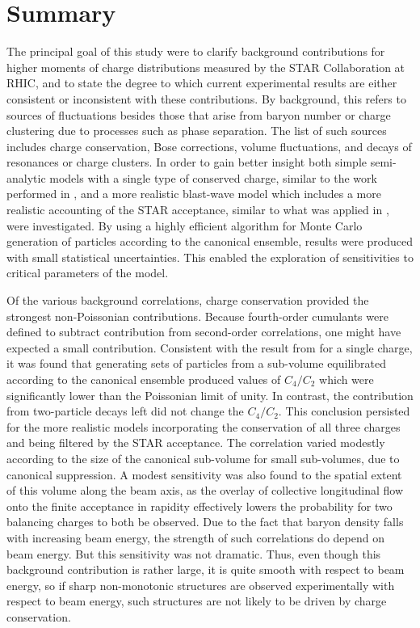 
\section{Summary}\label{sec:summary}
 
The principal goal of this study were to clarify background contributions for higher moments of charge distributions measured by the STAR Collaboration at RHIC, and to state the degree to which current experimental results are either consistent or inconsistent with these contributions. By background, this refers to sources of fluctuations besides those that arise from baryon number or charge clustering due to processes such as phase separation. The list of such sources includes charge conservation, Bose corrections, volume fluctuations, and decays of resonances or charge clusters. In order to gain better insight both simple semi-analytic models with a single type of conserved charge, similar to the work performed in \cite{Savchuk:2019xfg}, and a more realistic blast-wave model which includes a more realistic accounting of the STAR acceptance, similar to what was applied in \cite{Oliinychenko:2020cmr}, were investigated. By using a highly efficient algorithm for Monte Carlo generation of particles according to the canonical ensemble, results were produced with small statistical uncertainties. This enabled the exploration of sensitivities to critical parameters of the model.

Of the various background correlations, charge conservation provided the strongest non-Poissonian contributions. Because fourth-order cumulants were defined to subtract contribution from second-order correlations, one might have expected a small contribution. Consistent with the result from \cite{Savchuk:2019xfg} for a single charge, it was found that generating sets of particles from a sub-volume equilibrated according to the canonical ensemble produced values of $C_4/C_2$ which were significantly lower than the Poissonian limit of unity. In contrast, the contribution from two-particle decays left did not change the $C_4/C_2$. This conclusion persisted for the more realistic models incorporating the conservation of all three charges and being filtered by the STAR acceptance. The correlation varied modestly according to the size of the canonical sub-volume for small sub-volumes, due to canonical suppression. A modest sensitivity was also found to the spatial extent of this volume along the beam axis, as the overlay of collective longitudinal flow onto the finite acceptance in rapidity effectively lowers the probability for two balancing charges to both be observed. Due to the fact that baryon density falls with increasing beam energy, the strength of such correlations do depend on beam energy. But this sensitivity was not dramatic. Thus, even though this background contribution is rather large, it is quite smooth with respect to beam energy, so if sharp non-monotonic structures are observed experimentally with respect to beam energy, such structures are not likely to be driven by charge conservation. 

